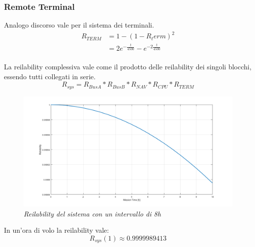 \subsubsection{Remote Terminal}
Analogo discorso vale per il sistema dei terminali.
\begin{equation*}
		\begin{split}
			R_{TERM} &= 1-(1-R_term)^2 \\
			&= 2e^{-\frac{t}{4500}} - e^{-2\frac{t}{4500}}
		\end{split}
\end{equation*}
\vspace{0.5cm}
\\La reilability complessiva vale come il prodotto delle reilability dei singoli blocchi, essendo tutti collegati in serie.
\begin{equation}
	\label{reilability_totale}
	R_{sys} = R_{BusA} * R_{BusB} * R_{NAV} * R_{CPU} * R_{TERM} 
\end{equation}
\begin{figure}[H]
	\centering
	\includegraphics[width=\textwidth]{img/hw5/es5_reilability.png}
	\caption{\textit{Reilability del sistema con un intervallo di 8h}}
\end{figure}
In un'ora di volo la reilability vale:
\begin{equation*}
	R_{sys}(1) \approx 0.9999989413 
\end{equation*}


